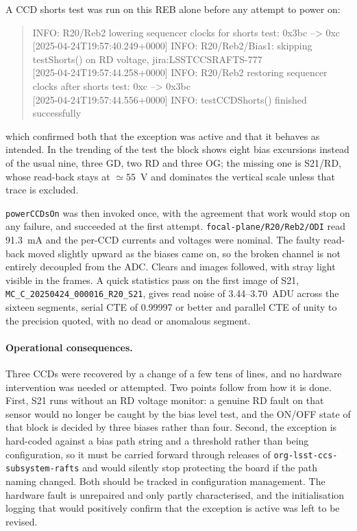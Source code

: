 A CCD shorts test was run on this REB alone before any attempt to power on:

\begin{quote}\small\ttfamily
[2025-04-24T19:57:38.742+0000] INFO: R20/Reb2 lowering sequencer clocks for
shorts test: 0x3bc --> 0xc \\
$[$2025-04-24T19:57:40.249+0000] INFO: R20/Reb2/Bias1: skipping testShorts()
on RD voltage, jira:LSSTCCSRAFTS-777 \\
$[$2025-04-24T19:57:44.258+0000] INFO: R20/Reb2 restoring sequencer clocks
after shorts test: 0xc --> 0x3bc \\
$[$2025-04-24T19:57:44.556+0000] INFO: testCCDShorts() finished successfully
\end{quote}

\noindent which confirmed both that the exception was active and that it
behaves as intended. In the trending of the test the block shows eight bias
excursions instead of the usual nine, three GD, two RD and three OG; the
missing one is S21/RD, whose read-back stays at $\simeq55$~V and dominates the
vertical scale unless that trace is excluded.

\texttt{powerCCDsOn} was then invoked once, with the agreement that work would
stop on any failure, and succeeded at the first attempt.
\texttt{focal-plane/R20/Reb2/ODI} read 91.3~mA and the per-CCD currents and
voltages were nominal. The faulty read-back moved slightly upward as the
biases came on, so the broken channel is not entirely decoupled from the ADC.
Clears and images followed, with stray light visible in the frames. A quick
statistics pass on the first image of S21,
\texttt{MC\_C\_20250424\_000016\_R20\_S21}, gives read noise of
3.44--3.70~ADU across the sixteen segments, serial CTE of 0.99997 or better
and parallel CTE of unity to the precision quoted, with no dead or anomalous
segment.

\paragraph{Operational consequences.}

Three CCDs were recovered by a change of a few tens of lines, and no hardware
intervention was needed or attempted. Two points follow from how it is done.
First, S21 runs without an RD voltage monitor: a genuine RD fault on that
sensor would no longer be caught by the bias level test, and the ON/OFF state
of that block is decided by three biases rather than four. Second, the
exception is hard-coded against a bias path string and a threshold rather than
being configuration, so it must be carried forward through releases of
\texttt{org-lsst-ccs-subsystem-rafts} and would silently stop protecting the
board if the path naming changed. Both should be tracked in configuration
management. The hardware fault is unrepaired and only partly characterised,
and the initialisation logging that would positively confirm that the
exception is active was left to be revised.
